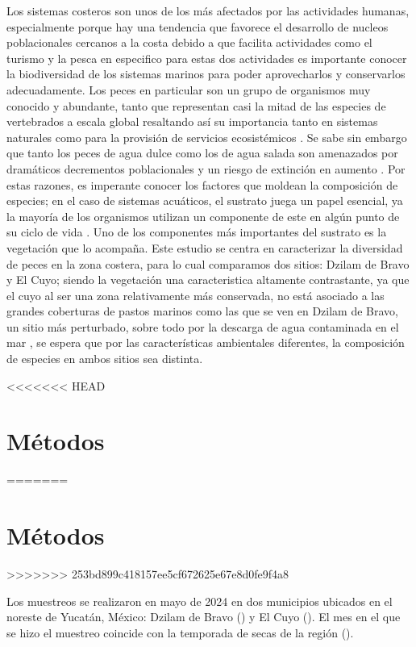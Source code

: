 \documentclass[
  authoryear,
  preprint,
  3p]{elsarticle}
\begin{document}
Los sistemas costeros son unos de los más afectados por las actividades
humanas, especialmente porque hay una tendencia que favorece el
desarrollo de nucleos poblacionales cercanos a la costa debido a que
facilita actividades como el turismo y la pesca \citep{barragán2015} en
especifico para estas dos actividades es importante conocer la
biodiversidad de los sistemas marinos para poder aprovecharlos y
conservarlos adecuadamente. Los peces en particular son un grupo de
organismos muy conocido y abundante, tanto que representan casi la mitad
de las especies de vertebrados a escala global \citep{bingpeng2018}
resaltando así su importancia tanto en sistemas naturales como para la
provisión de servicios ecosistémicos \citep{rönnbäck2007} . Se sabe sin
embargo que tanto los peces de agua dulce como los de agua salada son
amenazados por dramáticos decrementos poblacionales y un riesgo de
extinción en aumento \citep{arthington2016}. Por estas razones, es
imperante conocer los factores que moldean la composición de especies;
en el caso de sistemas acuáticos, el sustrato juega un papel esencial,
ya la mayoría de los organismos utilizan un componente de este en algún
punto de su ciclo de vida \citep{rönnbäck2007}. Uno de los componentes
más importantes del sustrato es la vegetación que lo acompaña. Este
estudio se centra en caracterizar la diversidad de peces en la zona
costera, para lo cual comparamos dos sitios: Dzilam de Bravo y El Cuyo;
siendo la vegetación una caracteristica altamente contrastante, ya que
el cuyo al ser una zona relativamente más conservada, no está asociado a
las grandes coberturas de pastos marinos como las que se ven en Dzilam
de Bravo, un sitio más perturbado, sobre todo por la descarga de agua
contaminada en el mar \citep{kantunmanzano2018}, se espera que por las
características ambientales diferentes, la composición de especies en
ambos sitios sea distinta.

<<<<<<< HEAD
\section{Métodos}\label{muxe9todos}
=======
\hypertarget{muxe9todos}{%
\section{Métodos}\label{muxe9todos}}
>>>>>>> 253bd899c418157ee5cf672625e67e8d0fe9f4a8

Los muestreos se realizaron en mayo de 2024 en dos municipios ubicados
en el noreste de Yucatán, México: Dzilam de Bravo () y El Cuyo (). El
mes en el que se hizo el muestreo coincide con la temporada de secas de
la región ().
\end{document}
